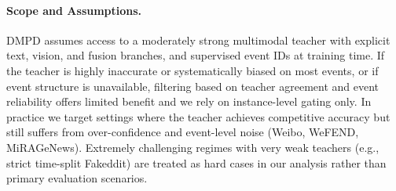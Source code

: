 \paragraph{Scope and Assumptions.} DMPD assumes access to a moderately strong multimodal teacher with explicit text, vision, and fusion branches, and supervised event IDs at training time. If the teacher is highly inaccurate or systematically biased on most events, or if event structure is unavailable, filtering based on teacher agreement and event reliability offers limited benefit and we rely on instance-level gating only. In practice we target settings where the teacher achieves competitive accuracy but still suffers from over-confidence and event-level noise (Weibo, WeFEND, MiRAGeNews). Extremely challenging regimes with very weak teachers (e.g., strict time-split Fakeddit) are treated as hard cases in our analysis rather than primary evaluation scenarios.
